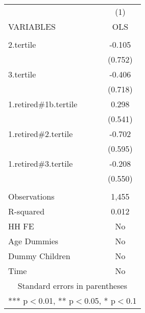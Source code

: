 \begin{tabular}{lc} \hline
 & (1) \\
VARIABLES & OLS \\ \hline
 &  \\
2.tertile & -0.105 \\
 & (0.752) \\
3.tertile & -0.406 \\
 & (0.718) \\
1.retired\#1b.tertile & 0.298 \\
 & (0.541) \\
1.retired\#2.tertile & -0.702 \\
 & (0.595) \\
1.retired\#3.tertile & -0.208 \\
 & (0.550) \\
 &  \\
Observations & 1,455 \\
R-squared & 0.012 \\
HH FE & No \\
Age Dummies & No \\
Dummy Children & No \\
 Time & No \\ \hline
\multicolumn{2}{c}{ Standard errors in parentheses} \\
\multicolumn{2}{c}{ *** p$<$0.01, ** p$<$0.05, * p$<$0.1} \\
\end{tabular}
